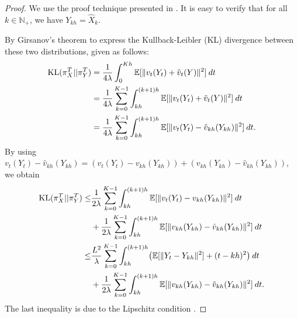 \begin{proof}
We use the proof technique presented in \cite{dalalyan2017theoretical,raginsky17a}.  It is easy to verify that for all $k \in \mathbb{N}_+$, we have $Y_{kh} = \hat{X}_k$. 

By Girsanov's theorem to express the Kullback-Leibler (KL) divergence between these two distributions, given as follows:
\begin{align}
\textnormal{KL} (\pi_{X}^T || \pi_{Y}^T) &= \frac1{4 \lambda} \int_0^{Kh} \mathbb{E}[ \|v_t(Y_t) + \tilde{v}_t(Y) \|^2 ]  \> dt \\
&= \frac1{4 \lambda} \sum_{k=0}^{K-1} \int_{kh}^{(k+1)h} \mathbb{E}[ \|v_t(Y_t) + \tilde{v}_t(Y) \|^2 ] \> dt \\
&= \frac1{4 \lambda} \sum_{k=0}^{K-1} \int_{kh}^{(k+1)h} \mathbb{E}[ \|v_t(Y_t) - \hat{v}_{kh}(Y_{kh}) \|^2 ] \> dt.
\end{align}
By using $v_t(Y_t) - \hat{v}_{kh}(Y_{kh}) = ( v_t(Y_t) - v_{kh}(Y_{kh})) + ( v_{kh}(Y_{kh}) - \hat{v}_{kh}(Y_{kh}))$, we obtain
%
\begin{align}
\nonumber \textnormal{KL} (\pi_{X}^T || \pi_{Y}^T) \leq& \frac1{2 \lambda} \sum_{k=0}^{K-1} \int_{kh}^{(k+1)h} \mathbb{E}[ \|v_t(Y_t) - {v}_{kh}(Y_{kh}) \|^2 ] \> dt \\
&+  \frac1{2 \lambda} \sum_{k=0}^{K-1} \int_{kh}^{(k+1)h} \mathbb{E}[ \|v_{kh}(Y_{kh}) - \hat{v}_{kh}(Y_{kh}) \|^2 ] \> dt \\
\nonumber \leq& \frac{L^2}{\lambda} \sum_{k=0}^{K-1} \int_{kh}^{(k+1)h} \bigl(\mathbb{E}[ \|Y_t - Y_{kh} \|^2 ] + (t-kh)^2 \bigr)  \> dt \\
&+  \frac1{2 \lambda} \sum_{k=0}^{K-1} \int_{kh}^{(k+1)h} \mathbb{E}[ \|v_{kh}(Y_{kh}) - \hat{v}_{kh}(Y_{kh}) \|^2 ] \> dt . \label{eqn:lem1_proof_interm}
\end{align}
The last inequality is due to the Lipschitz condition .


\end{proof}
